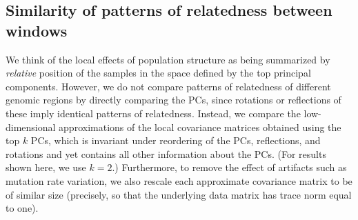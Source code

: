 \documentclass[11pt, oneside]{article}   	%
\renewcommand{\revpoint}[2]{\relax}
\begin{document}


\subsection{Similarity of patterns of relatedness between windows}

We think of the local effects of population structure as being summarized by \emph{relative} position of the samples
in the space defined by the top principal components.
However, 
we do not compare patterns of relatedness of different genomic regions by directly comparing the PCs,
since rotations or reflections of these imply identical patterns of relatedness.
Instead, we compare the low-dimensional approximations of the local covariance matrices
obtained using the top $k$ PCs,
which is invariant under reordering of the PCs, %
reflections, and rotations and yet contains all other information about the PCs.
(For results shown here, we use $k=2$.)
Furthermore, to remove the effect of artifacts such as mutation rate variation,
we also rescale each approximate covariance matrix to be of similar size
(precisely, so that the underlying data matrix has trace norm equal to one).
\end{document}
